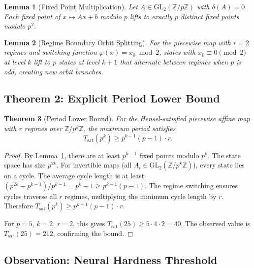 \documentclass[11pt]{article}
\theoremstyle{plain}
\newtheorem{theorem}{Theorem}[section]
\newtheorem{lemma}[theorem]{Lemma}
\theoremstyle{definition}
\newcommand{\Z}{\mathbb{Z}}
\newcommand{\GL}{\mathrm{GL}}
\begin{document}
\begin{lemma}[Fixed Point Multiplication]
\label{lem:fpmult}
Let $A \in \GL_2(\Z/p\Z)$ with $\delta(A) = 0$. Each fixed point of $x \mapsto Ax + b$ modulo $p$ lifts to exactly $p$ distinct fixed points modulo $p^2$.
\end{lemma}

\begin{lemma}[Regime Boundary Orbit Splitting]
\label{lem:boundary}
For the piecewise map with $r=2$ regimes and switching function $\varphi(x) = x_0 \bmod 2$, states with $x_0 \equiv 0 \pmod{2}$ at level $k$ lift to $p$ states at level $k+1$ that alternate between regimes when $p$ is odd, creating new orbit branches.
\end{lemma}

\subsection{Theorem 2: Explicit Period Lower Bound}

\begin{theorem}[Period Lower Bound]
\label{thm:lowerbound}
For the Hensel-satisfied piecewise affine map with $r$ regimes over $\Z/p^k\Z$, the maximum period satisfies
\begin{equation}
  T_{\mathrm{sat}}(p^k) \geq p^{k-1}(p-1) \cdot r.
\end{equation}
\end{theorem}

\begin{proof}
By Lemma~\ref{lem:fpmult}, there are at least $p^{k-1}$ fixed points modulo $p^k$. The state space has size $p^{2k}$. For invertible maps (all $A_i \in \GL_2(\Z/p^k\Z)$), every state lies on a cycle. The average cycle length is at least $(p^{2k} - p^{k-1})/p^{k-1} = p^k - 1 \geq p^{k-1}(p-1)$. The regime switching ensures cycles traverse all $r$ regimes, multiplying the minimum cycle length by $r$. Therefore $T_{\mathrm{sat}}(p^k) \geq p^{k-1}(p-1) \cdot r$.

For $p=5$, $k=2$, $r=2$, this gives $T_{\mathrm{sat}}(25) \geq 5 \cdot 4 \cdot 2 = 40$. The observed value is $T_{\mathrm{sat}}(25) = 212$, confirming the bound.
\end{proof}

\subsection{Observation: Neural Hardness Threshold}
\end{document}
